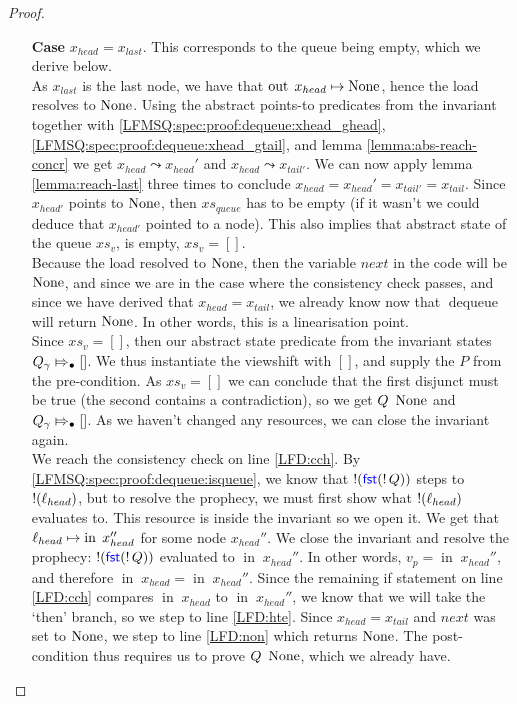 \documentclass[a4paper, 11pt]{report}
\newcommand{\dequeue}{\operatorname{dequeue}}
\newcommand{\nIn}[1]{\operatorname{in} \; #1}
\newcommand{\nOut}[1]{\operatorname{out} \; #1}
\newcommand{\Qg}{Q_\gname}
\newcommand{\abstractstateauth}[2]{#1 \Mapsto_{\bullet} #2}
\newcommand{\reach}[2]{#1 \leadsto #2}
\begin{document}
\begin{proof}
\begin{itemize}
    \begin{itemize}
      \item[\textbf{Case}] $x_{head} = x_{last}$. This corresponds to the queue being empty, which we derive below.\\
      As $x_{last}$ is the last node, we have that $\nOut{x_{head}} \mapsto \None$, hence the load resolves to $\operatorname{None}$. Using the abstract points-to predicates from the invariant together with \ref{LFMSQ:spec:proof:dequeue:xhead_ghead}, \ref{LFMSQ:spec:proof:dequeue:xhead_gtail}, and lemma \ref{lemma:abs-reach-concr} we get $\reach{x_{head}}{x_{head}'}$ and $\reach{x_{head}}{x_{tail'}}$. We can now apply lemma \ref{lemma:reach-last} three times to conclude $x_{head} = x_{head}' = x_{tail'} = x_{tail}$. Since $x_{head'}$ points to $\operatorname{None}$, then $xs_{queue}$ has to be empty (if it wasn't we could deduce that $x_{head'}$ pointed to a node). This also implies that abstract state of the queue $xs_v$, is empty, $xs_v = []$.\\
      Because the load resolved to $\operatorname{None}$, then the variable $next$ in the code will be $\operatorname{None}$, and since we are in the case where the consistency check passes, and since we have derived that $x_{head} = x_{tail}$, we already know now that $\dequeue$ will return $\operatorname{None}$. In other words, this is a linearisation point.\\
      Since $xs_v = []$, then our abstract state predicate from the invariant states $\abstractstateauth{\Qg}{[]}$. We thus instantiate the viewshift with $[]$, and supply the $P$ from the pre-condition. As $xs_v = []$ we can conclude that the first disjunct must be true (the second contains a contradiction), so we get $Q \ \None$ and $\abstractstateauth{\Qg}{[]}$. As we haven't changed any resources, we can close the invariant again.\\
      We reach the consistency check on line \ref{LFD:cch}. By \ref{LFMSQ:spec:proof:dequeue:isqueue}, we know that $\mathop{!}(\operatorname{\textsf{\color{blue} fst}} (\mathop{!} Q))$ steps to $\mathop{!}(\ell_{head})$, but to resolve the prophecy, we must first show what $\mathop{!}(\ell_{head})$ evaluates to. This resource is inside the invariant so we open it. We get that $\loc_{head} \mapsto \nIn{x_{head}''}$ for some node $x_{head}''$. We close the invariant and resolve the prophecy: $\mathop{!}(\operatorname{\textsf{\color{blue} fst}} (\mathop{!} Q))$ evaluated to $\nIn{x_{head}''}$. In other words, $v_p = \nIn{x_{head}''}$, and therefore $\nIn{x_{head}} = \nIn{x_{head}''}$. Since the remaining if statement on line \ref{LFD:cch} compares $\nIn{x_{head}}$ to $\nIn{x_{head}''}$, we know that we will take the `then' branch, so we step to line \ref{LFD:hte}. Since $x_{head} = x_{tail}$ and $next$ was set to $\operatorname{None}$, we step to line \ref{LFD:non} which returns $\operatorname{None}$. The post-condition thus requires us to prove $Q \ \None$, which we already have.


\end{itemize}
\end{itemize}
\end{proof}
\end{document}
